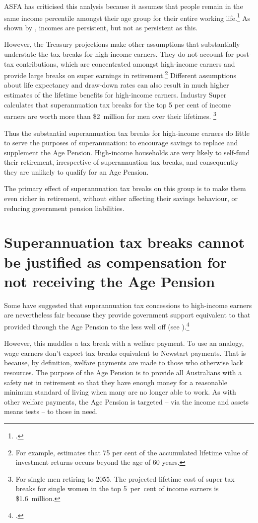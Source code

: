 ASFA has criticised this analysis because it assumes that people remain in the same income percentile amongst their age group for their entire working life.\footcite[][7--8]{Clare2012}  As shown by , incomes are persistent, but not as persistent as this. 

However, the Treasury projections make other assumptions that substantially understate the tax breaks for high-income earners. They do not account for post-tax contributions, which are concentrated amongst high-income earners and provide large breaks on super earnings in retirement.\footnote{For example, \textcite{Blayney2015} estimates that 75 per cent of the accumulated lifetime value of investment returns occurs beyond the age of 60 years.}  Different assumptions about life expectancy and draw-down rates can also result in much higher estimates of the lifetime benefits for high-income earners.  Industry Super calculates that superannuation tax breaks for the top 5 per cent of income earners are worth more than \$2~million for men over their lifetimes.%
\footnote{For single men retiring to 2055. The projected lifetime cost of super tax breaks for single women in the top 5~per~cent of income earners is \$1.6~million.} 

Thus the substantial superannuation tax breaks for high-income earners do little to serve the purposes of superannuation: to encourage savings to replace and supplement the Age Pension. High-income households are very likely to self-fund their retirement, irrespective of superannuation tax breaks, and consequently they are unlikely to qualify for an Age Pension. 

The primary effect of superannuation tax breaks on this group is to make them even richer in retirement, without either affecting their savings behaviour, or reducing government pension liabilities.

\section{Superannuation tax breaks cannot be justified as compensation for not receiving the Age Pension}\label{sec:SUPER-3-6}
Some have suggested that superannuation tax concessions to high-income earners are nevertheless fair because they provide government support equivalent to that provided through the Age Pension to the less well off (see ).\footcite[][46]{ASFA2015TreasurySubmission}  

However, this muddles a tax break with a welfare payment. To use an analogy, wage earners don’t expect tax breaks equivalent to Newstart payments. That is because, by definition, welfare payments are made to those who otherwise lack resources. The purpose of the Age Pension is to provide all Australians with a safety net in retirement so that they have enough money for a reasonable minimum standard of living when many are no longer able to work. As with other welfare payments, the Age Pension is targeted – via the income and assets means tests – to those in need. 

